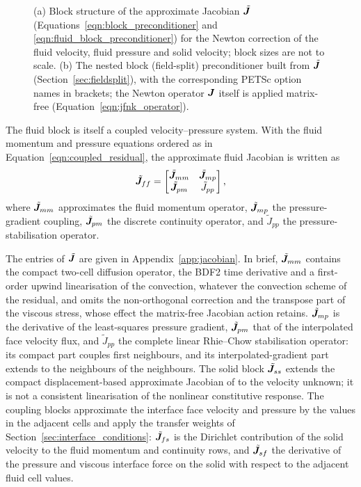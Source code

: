 \begin{figure}[tbp]
    \centering
    
    \caption{(a) Block structure of the approximate Jacobian $\tilde{\boldsymbol{J}}$ (Equations~\eqref{eqn:block_preconditioner} and \eqref{eqn:fluid_block_preconditioner}) for the Newton correction of the fluid velocity, fluid pressure and solid velocity; block sizes are not to scale. (b) The nested block (field-split) preconditioner built from $\tilde{\boldsymbol{J}}$ (Section~\ref{sec:fieldsplit}), with the corresponding PETSc option names in brackets; the Newton operator $\boldsymbol{J}$ itself is applied matrix-free (Equation~\eqref{eqn:jfnk_operator}).}
    \label{fig:block_preconditioner}
\end{figure}

The fluid block is itself a coupled velocity--pressure system. With the fluid
momentum and pressure equations ordered as in
Equation~\eqref{eqn:coupled_residual}, the approximate fluid Jacobian is written
as
\begin{equation}
    \tilde{\boldsymbol{J}}_{ff}
    =
    \begin{bmatrix}
    \tilde{\boldsymbol{J}}_{mm} & \tilde{\boldsymbol{J}}_{mp} \\
    \tilde{\boldsymbol{J}}_{pm} & \tilde{J}_{pp}
    \end{bmatrix},
    \label{eqn:fluid_block_preconditioner}
\end{equation}
where $\tilde{\boldsymbol{J}}_{mm}$ approximates the fluid momentum operator,
$\tilde{\boldsymbol{J}}_{mp}$ the pressure-gradient coupling,
$\tilde{\boldsymbol{J}}_{pm}$ the discrete continuity operator, and
$\tilde{J}_{pp}$ the pressure-stabilisation operator.

The entries of $\tilde{\boldsymbol{J}}$ are given in Appendix~\ref{app:jacobian}.
In brief, $\tilde{\boldsymbol{J}}_{mm}$ contains the compact two-cell diffusion operator, the BDF2 time derivative and a first-order upwind linearisation of the convection, whatever the convection scheme of the residual, and omits the non-orthogonal correction and the transpose part of the viscous stress, whose effect the matrix-free Jacobian action retains.
$\tilde{\boldsymbol{J}}_{mp}$ is the derivative of the least-squares pressure gradient, $\tilde{\boldsymbol{J}}_{pm}$ that of the interpolated face velocity flux, and $\tilde{J}_{pp}$ the complete linear Rhie--Chow stabilisation operator: its compact part couples first neighbours, and its interpolated-gradient part extends to the neighbours of the neighbours.
The solid block $\tilde{\boldsymbol{J}}_{ss}$ extends the compact displacement-based approximate Jacobian of \citet{Cardiff2026} to the velocity unknown; it is not a consistent linearisation of the nonlinear constitutive response.
The coupling blocks approximate the interface face velocity and pressure by the values in the adjacent cells and apply the transfer weights of Section~\ref{sec:interface_conditions}: $\tilde{\boldsymbol{J}}_{fs}$ is the Dirichlet contribution of the solid velocity to the fluid momentum and continuity rows, and $\tilde{\boldsymbol{J}}_{sf}$ the derivative of the pressure and viscous interface force on the solid with respect to the adjacent fluid cell values.

